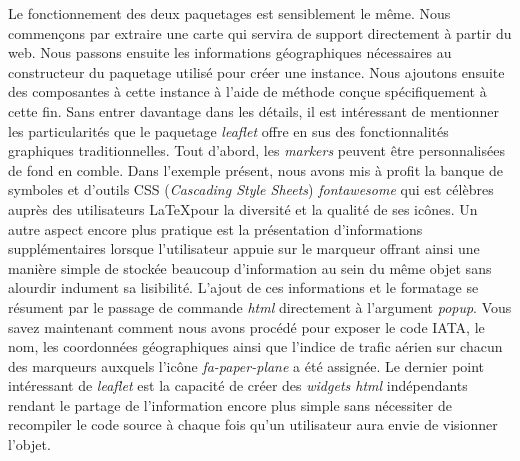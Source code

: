 \vspace{\baselineskip}
\noindent
Le fonctionnement des deux paquetages est sensiblement le même. Nous commençons par extraire une carte qui servira de support directement à partir du web. Nous passons ensuite les informations géographiques nécessaires au constructeur du paquetage utilisé pour créer une instance. Nous ajoutons ensuite des composantes à cette instance à l'aide de méthode conçue spécifiquement à cette fin. Sans entrer davantage dans les détails, il est intéressant de mentionner les particularités que le paquetage \emph{leaflet} offre en sus des fonctionnalités graphiques traditionnelles. Tout d'abord, les \emph{markers} peuvent être personnalisées de fond en comble. Dans l'exemple présent, nous avons mis à profit la banque de symboles et d'outils CSS (\emph{Cascading Style Sheets}) \emph{fontawesome} \cite{fontAwesome} qui est célèbres auprès des utilisateurs \LaTeX pour la diversité et la qualité de ses icônes. Un autre aspect encore plus pratique est la présentation d'informations supplémentaires lorsque l'utilisateur appuie sur le marqueur offrant ainsi une manière simple de stockée beaucoup d'information au sein du même objet sans alourdir indument sa lisibilité. L'ajout de ces informations et le formatage se résument par le passage de commande \emph{html} directement à l'argument \emph{popup}. Vous savez maintenant comment nous avons procédé pour exposer le code IATA, le nom, les coordonnées géographiques ainsi que l'indice de trafic aérien sur chacun des marqueurs auxquels l'icône \emph{fa-paper-plane} a été assignée. Le dernier point intéressant de \emph{leaflet} est la capacité de créer des \emph{widgets html} indépendants rendant le partage de l'information encore plus simple sans nécessiter de recompiler le code source à chaque fois qu'un utilisateur aura envie de visionner l'objet. \cite{leaflet} \\


